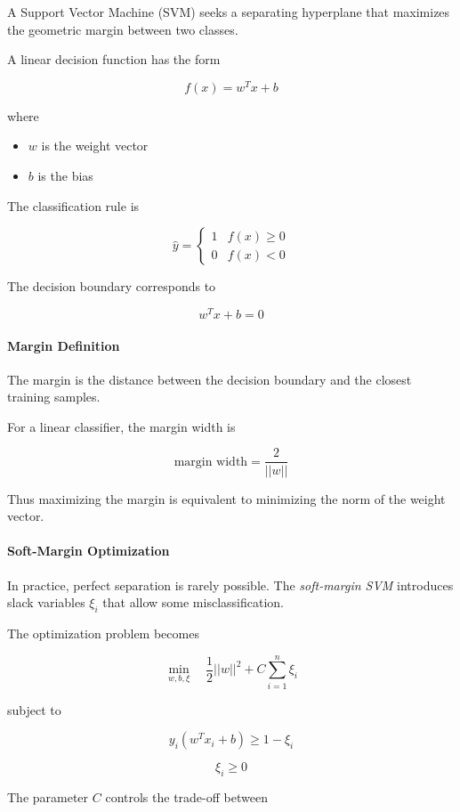 \documentclass[12pt]{article}
\begin{document}
A Support Vector Machine (SVM) seeks a separating hyperplane that maximizes the geometric margin between two classes.

A linear decision function has the form

\[
f(x) = w^T x + b
\]

where

\begin{itemize}
\item $w$ is the weight vector
\item $b$ is the bias
\end{itemize}

The classification rule is

\[
\hat{y} =
\begin{cases}
1 & f(x) \ge 0 \\
0 & f(x) < 0
\end{cases}
\]

The decision boundary corresponds to

\[
w^T x + b = 0
\]

\paragraph{Margin Definition}

The margin is the distance between the decision boundary and the closest training samples.

For a linear classifier, the margin width is

\[
\text{margin width} = \frac{2}{||w||}
\]

Thus maximizing the margin is equivalent to minimizing the norm of the weight vector.

\paragraph{Soft-Margin Optimization}

In practice, perfect separation is rarely possible.  
The \emph{soft-margin SVM} introduces slack variables $\xi_i$ that allow some misclassification.

The optimization problem becomes

\[
\min_{w,b,\xi}
\quad
\frac{1}{2}||w||^2
+
C\sum_{i=1}^{n}\xi_i
\]

subject to

\[
y_i(w^T x_i + b) \ge 1 - \xi_i
\]

\[
\xi_i \ge 0
\]

The parameter $C$ controls the trade-off between
\end{document}

